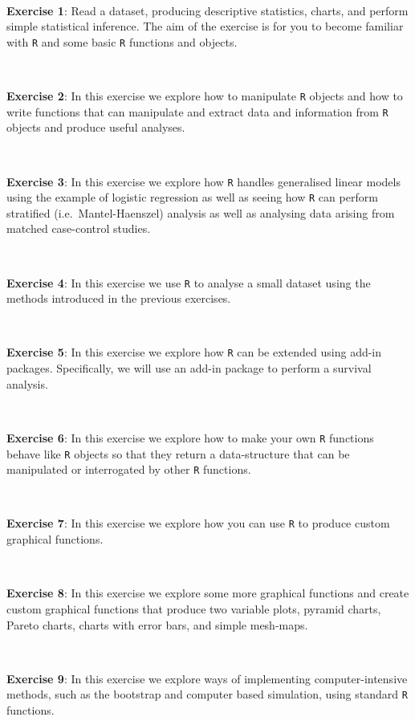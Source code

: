 \documentclass[
  12pt,
  a4paper]{book}
\begin{document}
~

\textbf{Exercise 1}: Read a dataset, producing descriptive statistics, charts, and perform simple statistical inference. The aim of the exercise is for you to become familiar with \texttt{R} and some basic \texttt{R} functions and objects.

~

\textbf{Exercise 2}: In this exercise we explore how to manipulate \texttt{R} objects and how to write functions that can manipulate and extract data and information from \texttt{R} objects and produce useful analyses.

~

\textbf{Exercise 3}: In this exercise we explore how \texttt{R} handles generalised linear models using the example of logistic regression as well as seeing how \texttt{R} can perform stratified (i.e.~Mantel-Haenszel) analysis as well as analysing data arising from matched case-control studies.

~

\textbf{Exercise 4}: In this exercise we use \texttt{R} to analyse a small dataset using the methods introduced in the previous exercises.

~

\textbf{Exercise 5}: In this exercise we explore how \texttt{R} can be extended using add-in packages. Specifically, we will use an add-in package to perform a survival analysis.

~

\textbf{Exercise 6}: In this exercise we explore how to make your own \texttt{R} functions behave like \texttt{R} objects so that they return a data-structure that can be manipulated or interrogated by other \texttt{R} functions.

~

\textbf{Exercise 7}: In this exercise we explore how you can use \texttt{R} to produce custom graphical functions.

~

\textbf{Exercise 8}: In this exercise we explore some more graphical functions and create custom graphical functions that produce two variable plots, pyramid charts, Pareto charts, charts with error bars, and simple mesh-maps.

~

\textbf{Exercise 9}: In this exercise we explore ways of implementing computer-intensive methods, such as the bootstrap and computer based simulation, using standard \texttt{R} functions.

~
\end{document}
